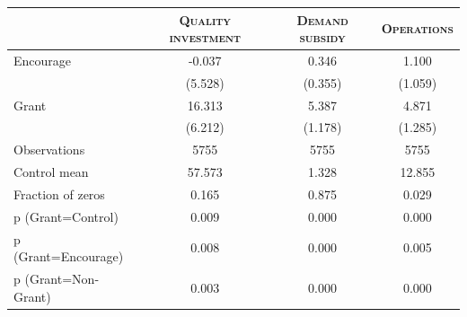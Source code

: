 \begin{tabular*}{\hsize}{@{\hskip\tabcolsep\extracolsep\fill}l*{3}{c}}
\toprule
                    & \textsc{Quality investment} & \textsc{Demand subsidy} & \textsc{Operations} \\
\midrule
Encourage           & -0.037   & 0.346   & 1.100   \\
                    & (5.528)  & (0.355) & (1.059) \\
\addlinespace
Grant               & 16.313   & 5.387\sym{***}   & 4.871\sym{***}   \\
                    & (6.212)  & (1.178) & (1.285) \\
\midrule
Observations        & 5755     & 5755    & 5755    \\
Control mean        & 57.573   & 1.328   & 12.855  \\
Fraction of zeros   & 0.165    & 0.875   & 0.029   \\
p (Grant=Control)   & 0.009    & 0.000   & 0.000   \\
p (Grant=Encourage) & 0.008    & 0.000   & 0.005   \\
p (Grant=Non-Grant) & 0.003    & 0.000   & 0.000   \\
\bottomrule
\end{tabular*}